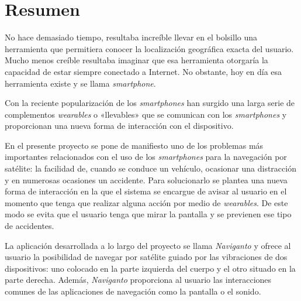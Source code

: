 \chapter{Resumen}

No hace demasiado tiempo, resultaba increíble llevar en el bolsillo una herramienta que permitiera
conocer la localización geográfica exacta del usuario. Mucho menos creíble resultaba imaginar que
esa herramienta otorgaría la capacidad de estar siempre conectado a Internet. No obstante, hoy en
día esa herramienta existe y se llama \emph{smartphone}.

Con la reciente popularización de los \emph{smartphones} han surgido una larga serie de complementos
\emph{wearables} o «llevables» que se comunican con los \emph{smartphones} y proporcionan una nueva
forma de interacción con el dispositivo.

En el presente proyecto se pone de manifiesto uno de los problemas más importantes relacionados con
el uso de los \emph{smartphones} para la navegación por satélite: la facilidad de, cuando se conduce
un vehículo, ocasionar una distracción y en numerosas ocasiones un accidente. Para solucionarlo se
plantea una nueva forma de interacción en la que el sistema se encargue de avisar al usuario en el
momento que tenga que realizar alguna acción por medio de \emph{wearables}. De este modo se evita
que el usuario tenga que mirar la pantalla y se previenen ese tipo de accidentes.

La aplicación desarrollada a lo largo del proyecto se llama \emph{Naviganto} y ofrece al usuario la
posibilidad de navegar por satélite guiado por las vibraciones de dos dispositivos: uno colocado en
la parte izquierda del cuerpo y el otro situado en la parte derecha. Además, \emph{Naviganto}
proporciona al usuario las interacciones comunes de las aplicaciones de navegación como la pantalla
o el sonido.

